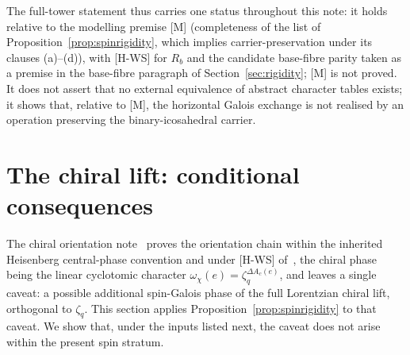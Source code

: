 \documentclass[11pt]{article}
\theoremstyle{definition}
\theoremstyle{remark}
\begin{document}
    The full-tower statement thus carries one status throughout this note: it holds relative to the modelling premise
    [M] (completeness of the list of Proposition~\ref{prop:spinrigidity}, which implies carrier-preservation under
    its clauses (a)--(d)), with [H-WS] for $R_b$ and the candidate base-fibre parity taken as a premise in the base-fibre paragraph of Section~\ref{sec:rigidity}; [M] is not
    proved.
    It does not assert that no external equivalence of abstract character tables exists; it shows that, relative to
    [M], the horizontal Galois exchange is not realised by an operation preserving the binary-icosahedral carrier.

  \section{The chiral lift: conditional consequences}
    \label{sec:chiral}

    The chiral orientation note~\cite{Beau2026cho} proves the orientation chain within the inherited Heisenberg
    central-phase convention and under [H-WS] of~\cite{Beau2026q11of}, the chiral phase being the linear cyclotomic
    character $\omega_\chi(e)=\zeta_q^{\Delta A_c(e)}$, and leaves a single caveat: a possible additional spin-Galois
    phase of the full Lorentzian chiral lift, orthogonal to $\zeta_q$.
    This section applies Proposition~\ref{prop:spinrigidity} to that caveat.
    We show that, under the inputs listed next, the caveat does not arise within the present spin stratum.
\end{document}
